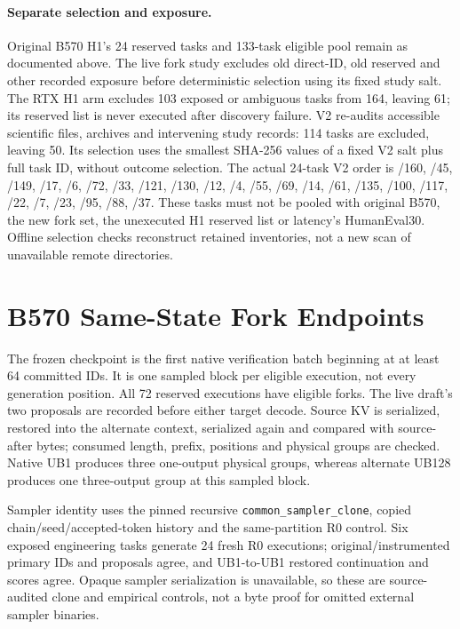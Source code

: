 \paragraph{Separate selection and exposure.}
Original B570 H1's 24 reserved tasks and 133-task eligible pool remain as documented above. The live fork study excludes old direct-ID, old reserved and other recorded exposure before deterministic selection using its fixed study salt. The RTX H1 arm excludes 103 exposed or ambiguous tasks from 164, leaving 61; its reserved list is never executed after discovery failure. V2 re-audits accessible scientific files, archives and intervening study records: 114 tasks are excluded, leaving 50. Its selection uses the smallest SHA-256 values of a fixed V2 salt plus full task ID, without outcome selection. The actual 24-task V2 order is /160, /45, /149, /17, /6, /72, /33, /121, /130, /12, /4, /55, /69, /14, /61, /135, /100, /117, /22, /7, /23, /95, /88, /37. These tasks must not be pooled with original B570, the new fork set, the unexecuted H1 reserved list or latency's HumanEval30. Offline selection checks reconstruct retained inventories, not a new scan of unavailable remote directories.

\section{B570 Same-State Fork Endpoints}
The frozen checkpoint is the first native verification batch beginning at at least 64 committed IDs. It is one sampled block per eligible execution, not every generation position. All 72 reserved executions have eligible forks. The live draft's two proposals are recorded before either target decode. Source KV is serialized, restored into the alternate context, serialized again and compared with source-after bytes; consumed length, prefix, positions and physical groups are checked. Native UB1 produces three one-output physical groups, whereas alternate UB128 produces one three-output group at this sampled block.

Sampler identity uses the pinned recursive \texttt{common\_sampler\_clone}, copied chain/seed/accepted-token history and the same-partition R0 control. Six exposed engineering tasks generate 24 fresh R0 executions; original/instrumented primary IDs and proposals agree, and UB1-to-UB1 restored continuation and scores agree. Opaque sampler serialization is unavailable, so these are source-audited clone and empirical controls, not a byte proof for omitted external sampler binaries.


